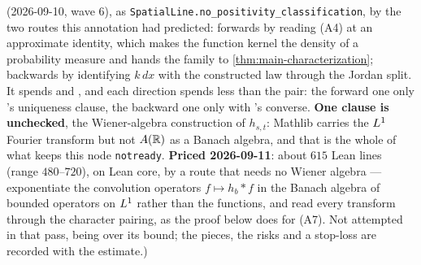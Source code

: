 \begin{proposition}
{(2026-09-10, wave 6), as \texttt{SpatialLine.no\_positivity\_classification}, by the two routes
this annotation had predicted: forwards by reading (A4) at an approximate identity, which makes
the function kernel the density of a probability measure and hands the family to
\ref{thm:main-characterization}; backwards by identifying $k\,dx$ with the constructed law
through the Jordan split. It spends  and , and each direction spends less
than the pair: the forward one only 's uniqueness clause, the backward one only
 with 's converse. \textbf{One clause is unchecked}, the Wiener-algebra
construction of $h_{s,t}$: Mathlib carries the $L^1$ Fourier transform but not $A(\mathbb{R})$ as a
Banach algebra, and that is the whole of what keeps this node \texttt{notready}. \textbf{Priced
2026-09-11}: about $615$ Lean lines (range $480$--$720$), on Lean core, by a route that needs no
Wiener algebra --- exponentiate the convolution operators $f \mapsto h_b * f$ in the Banach
algebra of bounded operators on $L^1$ rather than the functions, and read every transform
through the character pairing, as the proof below does for (A7). Not attempted in that pass,
being over its bound; the pieces, the risks and a stop-loss are recorded with the estimate.)}
\end{proposition}

